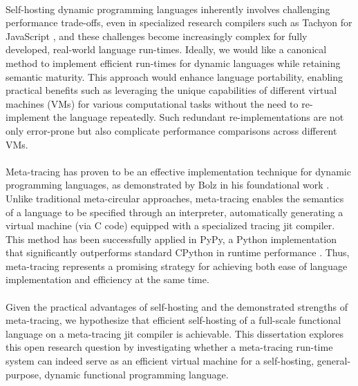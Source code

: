         \paragraph{}%
            Self-hosting dynamic programming languages inherently involves challenging performance trade-offs, even in specialized research compilers such as Tachyon for JavaScript \cite{self-hosted-tachyon}, and these challenges become increasingly complex for fully developed, real-world language run-times. Ideally, we would like a canonical method to implement efficient run-times for dynamic languages while retaining semantic maturity. This approach would enhance language portability, enabling practical benefits such as leveraging the unique capabilities of different virtual machines (VMs) for various computational tasks without the need to re-implement the language repeatedly. Such redundant re-implementations are not only error-prone but also complicate performance comparisons across different VMs.

        \paragraph{}%
            Meta-tracing has proven to be an effective implementation technique for dynamic programming languages, as demonstrated by Bolz in his foundational work \cite{bolzPhDThesis}. Unlike traditional meta-circular approaches, meta-tracing enables the semantics of a language to be specified through an interpreter, automatically generating a virtual machine (via C code) equipped with a specialized tracing \gls{jit} compiler. This method has been successfully applied in PyPy, a Python implementation that significantly outperforms standard CPython in runtime performance \cite{pypy-main}. Thus, meta-tracing represents a promising strategy for achieving both ease of language implementation and efficiency at the same time.

        \paragraph{}%
            Given the practical advantages of self-hosting and the demonstrated strengths of meta-tracing, we hypothesize that efficient self-hosting of a full-scale functional language on a meta-tracing \gls{jit} compiler is achievable. This dissertation explores this open research question by investigating whether a meta-tracing run-time system can indeed serve as an efficient virtual machine for a self-hosting, general-purpose, dynamic functional programming language.


